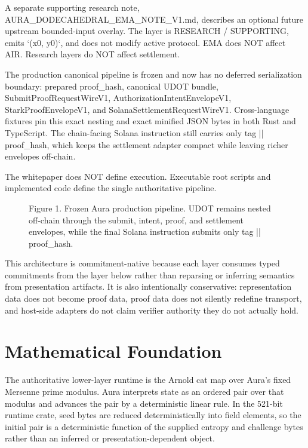 \documentclass[conference]{IEEEtran}
\begin{document}
A separate supporting research note, AURA\_DODECAHEDRAL\_EMA\_NOTE\_V1.md, describes an optional future upstream bounded-input overlay. The layer is RESEARCH / SUPPORTING, emits `(x0, y0)`, and does not modify active protocol. EMA does NOT affect AIR. Research layers do NOT affect settlement.

The production canonical pipeline is frozen and now has no deferred serialization boundary: prepared proof\_hash, canonical UDOT bundle, SubmitProofRequestWireV1, AuthorizationIntentEnvelopeV1, StarkProofEnvelopeV1, and SolanaSettlementRequestWireV1. Cross-language fixtures pin this exact nesting and exact minified JSON bytes in both Rust and TypeScript. The chain-facing Solana instruction still carries only tag || proof\_hash, which keeps the settlement adapter compact while leaving richer envelopes off-chain.

The whitepaper does NOT define execution. Executable root scripts and implemented code define the single authoritative pipeline.

\begin{figure}[t]
\centering

\caption{Figure 1. Frozen Aura production pipeline. UDOT remains nested off-chain through the submit, intent, proof, and settlement envelopes, while the final Solana instruction submits only tag || proof\_hash.}
\end{figure}
This architecture is commitment-native because each layer consumes typed commitments from the layer below rather than reparsing or inferring semantics from presentation artifacts. It is also intentionally conservative: representation data does not become proof data, proof data does not silently redefine transport, and host-side adapters do not claim verifier authority they do not actually hold.

\section{Mathematical Foundation}
The authoritative lower-layer runtime is the Arnold cat map over Aura's fixed Mersenne prime modulus. Aura interprets state as an ordered pair over that modulus and advances the pair by a deterministic linear rule. In the 521-bit runtime crate, seed bytes are reduced deterministically into field elements, so the initial pair is a deterministic function of the supplied entropy and challenge bytes rather than an inferred or presentation-dependent object.
\end{document}
